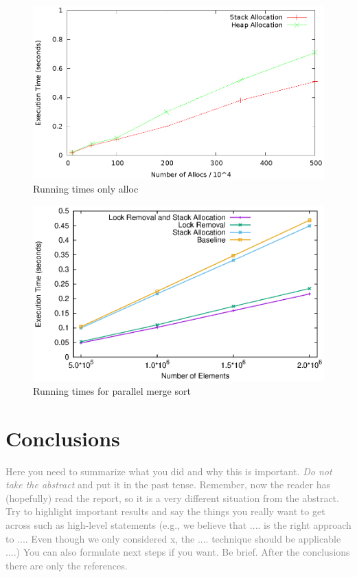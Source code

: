 \documentclass[letterpaper]{article}
\begin{document}
\begin{figure} \center
 \includegraphics[width=0.8\linewidth]{results_only_alloc.eps}
  \caption{Running times only alloc}
  \label{fig:alloc}
\end{figure}

\begin{figure} \center
 \includegraphics[width=0.8\linewidth]{results_merge.eps}
  \caption{Running times for parallel merge sort}
  \label{fig:merge}
\end{figure}

\section{Conclusions}

\textcolor{gray}{
Here you need to summarize what you did and why this is
important. {\em Do not take the abstract} and put it in the past
tense. Remember, now the reader has (hopefully) read the report, so it
is a very different situation from the abstract. Try to highlight
important results and say the things you really want to get across
such as high-level statements (e.g., we believe that .... is the right
approach to .... Even though we only considered x, the
.... technique should be applicable ....) You can also formulate next
steps if you want. Be brief. After the conclusions there are only the references.
}



\end{document}
